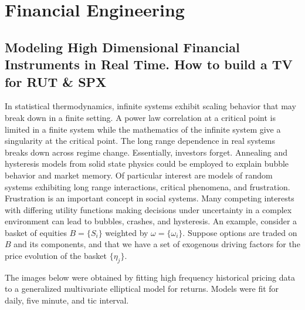 \def\baselinestretch{1}
 \chapter{Financial Engineering}


\section{Modeling High Dimensional Financial Instruments in Real
Time. How to build a TV for RUT \& SPX} In statistical
thermodynamics, infinite systems exhibit scaling behavior that
may break down in a finite setting.  A power law correlation at
a critical point is limited in a finite system while the
mathematics of the infinite system give a singularity at the
critical point.  The long range dependence in real systems
breaks down across regime change.  Essentially, investors
forget. Annealing and hysteresis models from solid state
physics could be employed to explain bubble behavior and market
memory.  Of particular interest are models of random systems
exhibiting long range interactions, critical phenomena, and
frustration. Frustration is an important concept in social
systems. Many competing interests with differing utility
functions making decisions under uncertainty in a complex
environment can lead to bubbles, crashes, and hysteresis. An
example, consider a basket of equities $B =\{S_i\}$ weighted by
$\omega=\{\omega_i\}$. Suppose options are traded on $B$ and
its components, and that we have a set of exogenous driving
factors for the price evolution of the basket $\{\eta_j\}$.

The images below were obtained by fitting high frequency
historical pricing data to a generalized multivariate
elliptical model for returns.  Models were fit for daily, five
minute, and tic interval.

